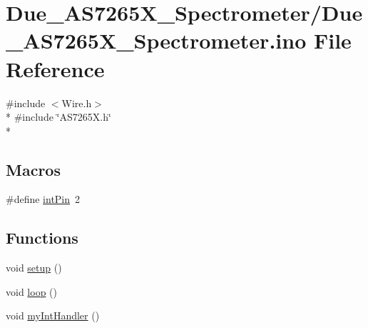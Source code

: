 \hypertarget{Due__AS7265X__Spectrometer_8ino}{\section{Due\-\_\-\-A\-S7265\-X\-\_\-\-Spectrometer/\-Due\-\_\-\-A\-S7265\-X\-\_\-\-Spectrometer.ino File Reference}
\label{Due__AS7265X__Spectrometer_8ino}
}
{\ttfamily \#include $<$Wire.\-h$>$}\\*
{\ttfamily \#include \char`\"{}A\-S7265\-X.\-h\char`\"{}}\\*
\subsection*{Macros}
\begin{DoxyCompactItemize}
\item 
\#define \hyperlink{Due__AS7265X__Spectrometer_8ino_a7a47c5b8a7e1c151db910d1c2518b08d}{int\-Pin}~2
\end{DoxyCompactItemize}
\subsection*{Functions}
\begin{DoxyCompactItemize}
\item 
void \hyperlink{Due__AS7265X__Spectrometer_8ino_a4fc01d736fe50cf5b977f755b675f11d}{setup} ()
\item 
void \hyperlink{Due__AS7265X__Spectrometer_8ino_afe461d27b9c48d5921c00d521181f12f}{loop} ()
\item 
void \hyperlink{Due__AS7265X__Spectrometer_8ino_a2b1030fb3c0ebb529adf1c6f0d31aa8b}{my\-Int\-Handler} ()
\end{DoxyCompactItemize}

